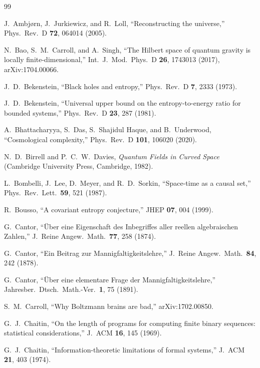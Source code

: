 \documentclass[11pt,a4paper]{article}
\theoremstyle{plain}
\theoremstyle{definition}
\theoremstyle{remark}
\begin{document}
\begin{thebibliography}{99}

J.~Ambj{\o}rn, J.~Jurkiewicz, and R.~Loll,
``Reconstructing the universe,''
Phys.\ Rev.\ D \textbf{72}, 064014 (2005).

N.~Bao, S.~M.~Carroll, and A.~Singh,
``The Hilbert space of quantum gravity is locally finite-dimensional,''
Int.\ J.\ Mod.\ Phys.\ D \textbf{26}, 1743013 (2017),
arXiv:1704.00066.

J.~D.~Bekenstein,
``Black holes and entropy,''
Phys.\ Rev.\ D \textbf{7}, 2333 (1973).

J.~D.~Bekenstein,
``Universal upper bound on the entropy-to-energy ratio for bounded systems,''
Phys.\ Rev.\ D \textbf{23}, 287 (1981).

A.~Bhattacharyya, S.~Das, S.~Shajidul Haque, and B.~Underwood,
``Cosmological complexity,''
Phys.\ Rev.\ D \textbf{101}, 106020 (2020).

N.~D.~Birrell and P.~C.~W.~Davies,
\textit{Quantum Fields in Curved Space}
(Cambridge University Press, Cambridge, 1982).

L.~Bombelli, J.~Lee, D.~Meyer, and R.~D.~Sorkin,
``Space-time as a causal set,''
Phys.\ Rev.\ Lett.\ \textbf{59}, 521 (1987).

R.~Bousso,
``A covariant entropy conjecture,''
JHEP \textbf{07}, 004 (1999).

G.~Cantor,
``\"Uber eine Eigenschaft des Inbegriffes aller reellen algebraischen Zahlen,''
J.\ Reine Angew.\ Math.\ \textbf{77}, 258 (1874).

G.~Cantor,
``Ein Beitrag zur Mannigfaltigkeitslehre,''
J.\ Reine Angew.\ Math.\ \textbf{84}, 242 (1878).

G.~Cantor,
``\"Uber eine elementare Frage der Mannigfaltigkeitslehre,''
Jahresber.\ Dtsch.\ Math.-Ver.\ \textbf{1}, 75 (1891).

S.~M.~Carroll,
``Why Boltzmann brains are bad,''
arXiv:1702.00850.

G.~J.~Chaitin,
``On the length of programs for computing finite binary sequences: statistical considerations,''
J.\ ACM \textbf{16}, 145 (1969).

G.~J.~Chaitin,
``Information-theoretic limitations of formal systems,''
J.\ ACM \textbf{21}, 403 (1974).


\end{thebibliography}
\end{document}
